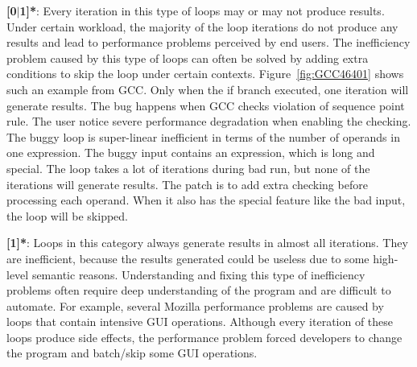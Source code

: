 {\textbf{[0$|$1]*}}:
Every iteration in this type of loops may or may not produce results.
Under certain workload, the majority of the loop iterations do not produce
any results and lead to performance problems perceived by end users.
The inefficiency problem caused by this type of loops can often be solved
by adding extra conditions to skip the loop under certain contexts.
Figure~\ref{fig:GCC46401} shows such an example from GCC.
Only when the if branch executed,
one iteration will generate results. 
The bug happens when GCC checks violation of sequence point rule. 
The user notice severe performance degradation when enabling the checking. 
The buggy loop is super-linear inefficient in terms of the number of operands
in one expression. The buggy input contains an expression, which is long and special. 
The loop takes a lot of iterations during bad run, but none of the iterations will 
generate results. 
The patch is to add extra checking before processing each operand. When it also has
the special feature like the bad input, the loop will be skipped. 

\comment{
\textcolor{red}{ 
For example, a long expression inside the bug-triggering input exposes the super-linear 
inefficiency of checking violation of sequence point rule for GCC\#46401. 
Each operand on the expression will be compared with all previous operands on the same expression.
When fixing the bug,
developers notice that each operand on the buggy expression has a special feature which make the violation checking never 
report warning (generate results). 
The patch designed by developers is to add an extra condition checking to skip the violation checking for operands with that feature.    
}
}

{\textbf{[1]*}}:
Loops in this category always generate results in almost all iterations. 
They are inefficient, because the results generated could be useless due to
some high-level semantic reasons.
Understanding and fixing this type of inefficiency problems often require
deep understanding of the program and are difficult to automate.
For example, several Mozilla performance problems are caused by 
loops that contain intensive GUI operations.
Although every iteration of these loops produce side effects, 
the performance problem forced developers to change the program 
and batch/skip some GUI operations.

